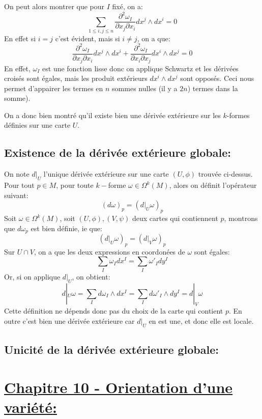 \begin{itemize}
\[         \]
         On peut alors montrer que pour \( I \) fixé, on a:
         \[ 
            \sum_{1 \leq i, j\leq n} \frac{\partial^2 \omega_I}{\partial x_j \partial x_i} dx^j \wedge dx^i = 0
         \]
         En effet si \( i = j \) c'est évident, mais si \( i \neq j \), on a que:
         \[ 
            \frac{\partial^2 \omega_I}{\partial x_j \partial x_i} dx^j \wedge dx^i + \frac{\partial^2 \omega_I}{\partial x_i \partial x_j} dx^i \wedge dx^j = 0
         \]
         En effet, \( \omega_I \) est une fonction lisse donc on applique Schwartz et les dérivées croisés sont égales, mais les produit extérieurs \( dx^i \wedge dx^j \) sont opposés. Ceci nous permet d'appairer les termes en \( n \) sommes nulles (il y a \( 2n \)) termes dans la somme).
      \end{itemize}
   On a donc bien montré qu'il existe bien une dérivée extérieure sur les \( k \)-formes définies sur une carte \( U \).
   \pagebreak
   \subsection*{Existence de la dérivée extérieure globale{:}}
   On note \( d|_U \) l'unique dérivée extérieure sur une carte \( (U, \phi) \) trouvée ci-dessus. Pour tout \( p \in M \), pour toute \( k- \)forme \( \omega \in \Omega^k(M)\), alors on définit l'opérateur suivant:
   \[ 
      (d\omega)_p = (d|_U\omega)_p
   \]
   Soit \( \omega \in \Omega^k(M) \), soit \( (U, \phi), (V, \psi) \) deux cartes qui contiennent \( p \), montrons que \( d\omega_p \) est bien définie, ie que:
   \[ 
      (d|_U\omega)_p = (d|_V\omega)_p
   \]
   Sur \( U \cap V \), on a que les deux expressions en coordonées de \( \omega \) sont égales:
   \[ 
      \sum_I \omega_I dx^I = \sum_I \omega'_I dy^I
   \]
   Or, si on applique \( d|_U \), on obtient:
   \[ 
      d|_U\omega = \sum_I d\omega_I \wedge dx^I = \sum_I d\omega'_I \wedge dy^I = d|_V\omega
   \]
   Cette définition ne dépends donc pas du choix de la carte qui contient \( p \). En outre c'est bien une dérivée extérieure car \( d|_U \) en est une, et donc elle est locale.
   \subsection*{Unicité de la dérivée extérieure globale{:}}
\pagebreak
\section*{\uline{Chapitre 10 - Orientation d'une variété{:}}}
